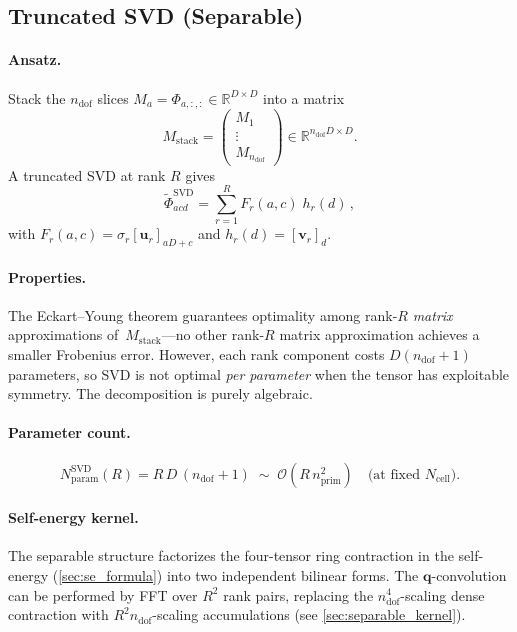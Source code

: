 \documentclass[11pt]{article}
\newcommand{\vc}[1]{\bm{#1}}
\newcommand{\ndof}{n_{\mathrm{dof}}}
\newcommand{\nprim}{n_{\mathrm{prim}}}
\newcommand{\vq}{\vc{q}}
\newcommand{\cO}{\mathcal{O}}
\begin{document}
\subsection{Truncated SVD (Separable)}
\label{sec:svd}

\paragraph{Ansatz.}
Stack the $\ndof$ slices $M_a = \Phi_{a,:,:} \in \mathbb{R}^{D\times D}$
into a matrix
\begin{equation}\label{eq:mstacked}
  M_{\mathrm{stack}} =
  \begin{pmatrix} M_1 \\ \vdots \\ M_{\ndof} \end{pmatrix}
  \in \mathbb{R}^{\ndof D \times D}.
\end{equation}
A truncated SVD at rank $R$ gives
\begin{equation}\label{eq:sep}
  \boxed{
    \tilde\Phi_{acd}^{\mathrm{SVD}}
    = \sum_{r=1}^{R} F_r(a,c)\; h_r(d)\,,
  }
\end{equation}
with $F_r(a,c) = \sigma_r [\vc{u}_r]_{aD + c}$ and
$h_r(d) = [\vc{v}_r]_d$.

\paragraph{Properties.}
The Eckart--Young theorem guarantees optimality among rank-$R$
\emph{matrix} approximations of~$M_{\mathrm{stack}}$---no other
rank-$R$ matrix approximation achieves a smaller Frobenius error.
However, each rank component costs $D(\ndof + 1)$ parameters, so SVD
is not optimal \emph{per parameter} when the tensor has exploitable
symmetry.  The decomposition is purely algebraic.

\paragraph{Parameter count.}
\begin{equation}\label{eq:svd-params}
  N_{\mathrm{param}}^{\mathrm{SVD}}(R) = R\,D\,(\ndof + 1)
  \;\sim\; \cO(R\,\nprim^2)
  \quad\text{(at fixed $N_{\mathrm{cell}}$).}
\end{equation}

\paragraph{Self-energy kernel.}
The separable structure factorizes the four-tensor ring contraction in
the self-energy (\cref{sec:se_formula}) into two independent bilinear
forms.  The $\vq$-convolution can be performed by FFT over $R^2$ rank
pairs, replacing the $\ndof^4$-scaling dense contraction with $R^2
\ndof$-scaling accumulations (see \cref{sec:separable_kernel}).
\end{document}
